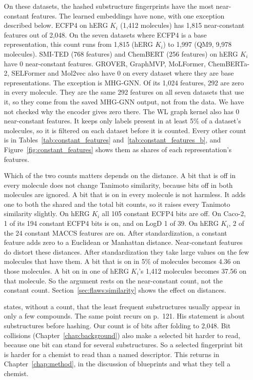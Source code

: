 On these datasets, the hashed substructure fingerprints have the most near-constant features. The learned embeddings have none, with one exception described below. ECFP4 on hERG $K_i$ (1,412 molecules) has 1,815 near-constant features out of 2,048. On the seven datasets where ECFP4 is a base representation, this count runs from 1,815 (hERG $K_i$) to 1,997 (QM9, 9,978 molecules). SMI-TED (768 features) and ChemBERT (256 features) on hERG $K_i$ have 0 near-constant features. GROVER, GraphMVP, MoLFormer, ChemBERTa-2, SELFormer and Mol2vec also have 0 on every dataset where they are base representations. The exception is MHG-GNN. Of its 1,024 features, 292 are zero in every molecule. They are the same 292 features on all seven datasets that use it, so they come from the saved MHG-GNN output, not from the data. We have not checked why the encoder gives zero there. The WL graph kernel also has 0 near-constant features. It keeps only labels present in at least 5\% of a dataset's molecules, so it is filtered on each dataset before it is counted. Every other count is in Tables~\ref{tab:constant_features} and~\ref{tab:constant_features_b}, and Figure~\ref{fig:constant_features} shows them as shares of each representation's features.

Which of the two counts matters depends on the distance. A bit that is off in every molecule does not change Tanimoto similarity, because bits off in both molecules are ignored. A bit that is on in every molecule is not harmless. It adds one to both the shared and the total bit counts, so it raises every Tanimoto similarity slightly. On hERG $K_i$ all 105 constant ECFP4 bits are off. On Caco-2, 1 of its 194 constant ECFP4 bits is on, and on LogD 1 of 39. On hERG $K_i$, 2 of the 24 constant MACCS features are on. After standardization, a constant feature adds zero to a Euclidean or Manhattan distance. Near-constant features do distort these distances. After standardization they take large values on the few molecules that have them. A bit that is on in 5\% of molecules becomes 4.36 on those molecules. A bit on in one of hERG $K_i$'s 1,412 molecules becomes 37.56 on that molecule. So the argument rests on the near-constant count, not the constant count. Section~\ref{sec:flaws:similarity} shows the effect on distances.

\citet[p.~112]{Dablander2024} states, without a count, that the least frequent substructures usually appear in only a few compounds. The same point recurs on p.~121. His statement is about substructures before hashing. Our count is of bits after folding to 2,048. Bit collisions (Chapter~\ref{chap:background}) also make a selected bit harder to read, because one bit can stand for several substructures. So a selected fingerprint bit is harder for a chemist to read than a named descriptor. This returns in Chapter~\ref{chap:method}, in the discussion of blueprints and what they tell a chemist.

